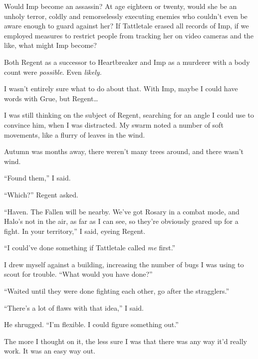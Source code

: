 Would Imp become an assassin?  At age eighteen or twenty, would she be an unholy terror, coldly and remorselessly executing enemies who couldn't even be aware enough to guard against her?  If Tattletale erased all records of Imp, if we employed measures to restrict people from tracking her on video cameras and the like, what might Imp become?



Both Regent as a successor to Heartbreaker and Imp as a murderer with a body count were \emph{possible}.  Even \emph{likely.}



I wasn't entirely sure what to do about that.  With Imp, maybe I could have words with Grue, but Regent\ldots



I was still thinking on the subject of Regent, searching for an angle I could use to convince him, when I was distracted.  My swarm noted a number of soft movements, like a flurry of leaves in the wind.



Autumn was months away, there weren't many trees around, and there wasn't wind.



``Found them,'' I said.



``Which?'' Regent asked.



``Haven.  The Fallen will be nearby.  We've got Rosary in a combat mode, and Halo's not in the air, as far as I can see, so they're obviously geared up for a fight.  In your territory,'' I said, eyeing Regent.



``I could've done something if Tattletale called \emph{me} first.''



I drew myself against a building, increasing the number of bugs I was using to scout for trouble.  ``What would you have done?''



``Waited until they were done fighting each other, go after the stragglers.''



``There's a lot of flaws with that idea,'' I said.



He shrugged.  ``I'm flexible.  I could figure something out.''



The more I thought on it, the less sure I was that there was any way it'd really work.  It was an easy way out.



